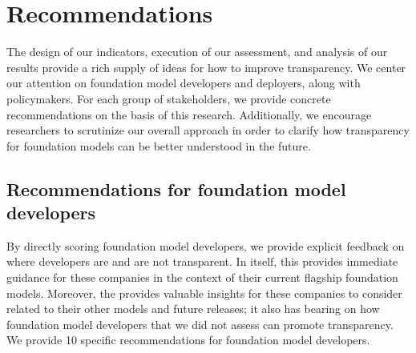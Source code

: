 
\hypertarget{recommendations}{\section{Recommendations}}
\label{sec:recommendations}
The design of our indicators, execution of our assessment, and analysis of our results provide a rich supply of ideas for how to improve transparency. 
We center our attention on foundation model developers and deployers, along with policymakers.
For each group of stakeholders, we provide concrete recommendations on the basis of this research.
Additionally, we encourage researchers to scrutinize our overall approach in order to clarify how transparency for foundation models can be better understood in the future. 

\hypertarget{recommendations-developers}{\subsection{Recommendations for foundation model developers}}
\label{sec:recommendations-developers}
By directly scoring foundation model developers, we provide explicit feedback on where developers are and are not transparent.
In itself, this provides immediate guidance for these \numcompanies companies in the context of their current flagship foundation models.
Moreover, the \projectname provides valuable insights for these companies to consider related to their other models and future releases; it also has bearing on how foundation model developers that we did not assess can promote transparency. We provide 10 specific recommendations for foundation model developers.

